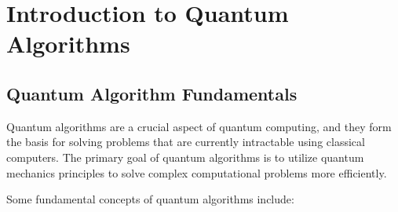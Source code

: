 \chapter{Introduction to Quantum Algorithms}
\section{Quantum Algorithm Fundamentals}

Quantum algorithms are a crucial aspect of quantum computing, and they form the basis for solving problems that are currently intractable using classical computers. The primary goal of quantum algorithms is to utilize quantum mechanics principles to solve complex computational problems more efficiently.

Some fundamental concepts of quantum algorithms include:

